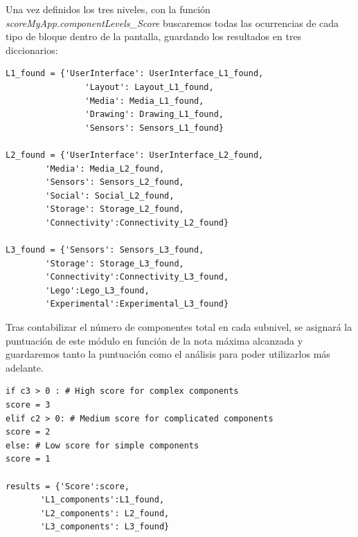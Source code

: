 \documentclass[a4paper, 12pt]{book}
\begin{document}
Una vez definidos los tres niveles, con la función \textit{scoreMyApp.componentLevels\_Score} buscaremos todas las ocurrencias de cada tipo de bloque dentro de la pantalla, guardando los resultados en tres diccionarios:
\begin{lstlisting}
L1_found = {'UserInterface': UserInterface_L1_found,
                'Layout': Layout_L1_found,
                'Media': Media_L1_found,
                'Drawing': Drawing_L1_found,
                'Sensors': Sensors_L1_found}
    
L2_found = {'UserInterface': UserInterface_L2_found,
        'Media': Media_L2_found,
        'Sensors': Sensors_L2_found,
        'Social': Social_L2_found,
        'Storage': Storage_L2_found,
        'Connectivity':Connectivity_L2_found}
    
L3_found = {'Sensors': Sensors_L3_found,
        'Storage': Storage_L3_found,
        'Connectivity':Connectivity_L3_found,
        'Lego':Lego_L3_found,
        'Experimental':Experimental_L3_found}
\end{lstlisting}
Tras contabilizar el número de componentes total en cada subnivel, se asignará la puntuación de este módulo en función de la nota máxima alcanzada y guardaremos tanto la puntuación como el análisis para poder utilizarlos más adelante.   
\begin{lstlisting}
if c3 > 0 : # High score for complex components
score = 3
elif c2 > 0: # Medium score for complicated components
score = 2
else: # Low score for simple components
score = 1

results = {'Score':score,
       'L1_components':L1_found,
       'L2_components': L2_found,
       'L3_components': L3_found}
\end{lstlisting}
\end{document}
